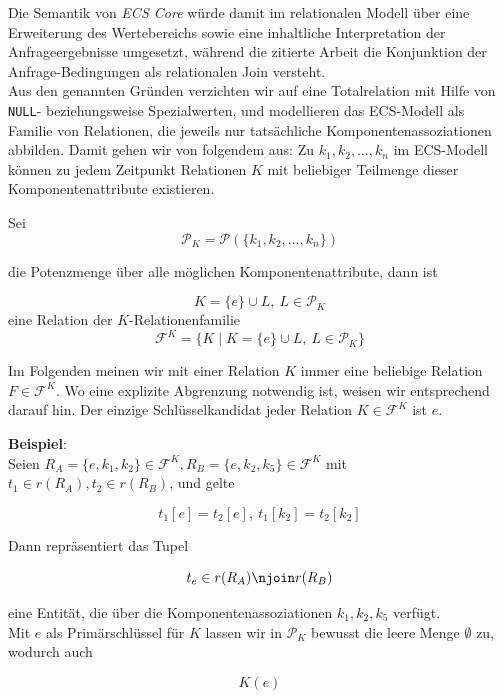 \bigskip
 Die Semantik von \textit{ECS Core} würde damit im relationalen Modell über eine Erweiterung des Wertebereichs sowie eine inhaltliche Interpretation der Anfrageergebnisse umgesetzt, während die zitierte Arbeit die Konjunktion der Anfrage-Bedingungen als relationalen Join versteht.\\

Aus den genannten Gründen verzichten wir auf eine Totalrelation mit Hilfe von \texttt{NULL}- beziehungsweise Spezialwerten, und modellieren das ECS-Modell als Familie von Relationen, die jeweils nur tatsächliche Komponentenassoziationen abbilden.
Damit gehen wir von folgendem aus: Zu $k_1, k_2, \ldots, k_n$ im ECS-Modell können zu jedem Zeitpunkt Relationen $K$ mit beliebiger Teilmenge dieser Komponentenattribute existieren.
\bigskip

\begin{definition}\label{def:k-relationenfamilie}
Sei
\[
    \mathcal{P}_K = \mathcal{P}(\{k_1, k_2, \ldots, k_n\})
\]

\noindent
die Potenzmenge über alle möglichen Komponentenattribute, dann ist

\[
    K = \{e\} \cup L, \ L \in \mathcal{P}_K
\]
eine Relation der $K$-Relationenfamilie
\[
    \mathcal{F}^K = \{ K \mid  K = \{e\} \cup L, \ L \in \mathcal{P}_K \}
\]
\end{definition}
\bigskip

Im Folgenden meinen wir mit einer Relation $K$ immer eine beliebige Relation $F \in \mathcal{F}^K$.
Wo eine explizite Abgrenzung notwendig ist, weisen wir entsprechend darauf hin.
Der einzige Schlüsselkandidat jeder Relation $K \in \mathcal{F}^K$ ist $e$.


\noindent
\textbf{Beispiel}:\\
Seien $R_{A} = \{e, k_1, k_2\} \in \mathcal{F}^K, R_{B} = \{e, k_2, k_5\} \in \mathcal{F}^K$ mit $t_1 \in r(R_{A}), t_2 \in r(R_{B})$, und gelte

\[
     t_1[e] = t_2[e],\ t_1[k_2] = t_2[k_2]
\]

\noindent
Dann repräsentiert das Tupel

\[
   t_e \in r(R_{A}) \njoin r(R_{B})
\]

\noindent
eine Entität, die über die Komponentenassoziationen $k_1, k_2, k_5$ verfügt.\\

Mit $e$ als Primärschlüssel für $K$ lassen wir in $\mathcal{P}_K$ bewusst die leere Menge $\emptyset$ zu, wodurch auch

\[
    K(e)
\]
\smallskip

